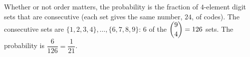 Whether or not order matters, the probability is the fraction of $4$-element digit sets that are consecutive (each set gives the same number, $24$, of codes). The consecutive sets are $\{1,2,3,4\},\dots,\{6,7,8,9\}$: $6$ of the $\dbinom94=126$ sets. The probability is $\dfrac{6}{126}=\boxed{\dfrac{1}{21}}$.
